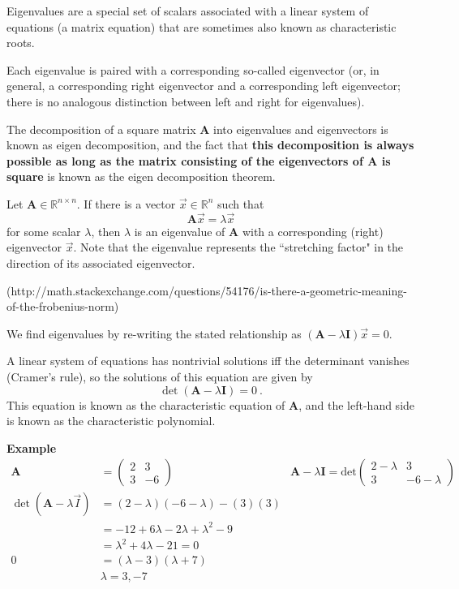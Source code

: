 \documentclass[12pt]{article}
\newcommand{\ve}[1]{\ensuremath{\mathbf{#1}}}
\begin{document}
Eigenvalues are a special set of scalars associated with a linear system of equations (a matrix equation) that are sometimes also known as characteristic roots. 

Each eigenvalue is paired with a corresponding so-called eigenvector (or, in general, a corresponding right eigenvector and a corresponding left eigenvector; there is no analogous distinction between left and right for eigenvalues).

The decomposition of a square matrix $\ve{A}$ into eigenvalues and eigenvectors is known as eigen decomposition, and the fact that \textbf{this decomposition is always possible as long as the matrix consisting of the eigenvectors of $\ve{A}$ is square} is known as the eigen decomposition theorem.

Let $\ve{A} \in \mathbb{R}^{n \times n}$. If there is a vector $\vec{x} \in \mathbb{R}^{n}$ such that
%
\[\ve{A} \vec{x} = \lambda \vec{x}\]
%
for some scalar $\lambda$, then $\lambda$ is an eigenvalue of $\ve{A}$ with a corresponding (right) eigenvector $\vec{x}$. Note that the eigenvalue represents the ``stretching factor" in the direction of its associated eigenvector. 

(http://math.stackexchange.com/questions/54176/is-there-a-geometric-meaning-of-the-frobenius-norm)
 
We find eigenvalues by re-writing the stated relationship as $(\ve{A} - \lambda \ve{I})\vec{x}=0$.

A linear system of equations has nontrivial solutions iff the determinant vanishes (Cramer's rule), so the solutions of this equation are given by
%
\[\det(\ve{A} - \lambda \ve{I})=0 \:.\] 	
%
This equation is known as the characteristic equation of $\ve{A}$, and the left-hand side is known as the characteristic polynomial.

\textbf{Example}
\begin{align}
    \ve{A} &= \begin{pmatrix}
        2 & 3 \\
        3 & -6
    \end{pmatrix} 
    &\ve{A} - \lambda \ve{I} = \text{det}\begin{pmatrix}
        2 - \lambda & 3 \\
        3 & -6 - \lambda
    \end{pmatrix} \nonumber \\
%  
\det(\ve{A} - \lambda \vec{I}) &= (2 - \lambda)(-6 - \lambda) - (3)(3) \nonumber \\
%
&= -12 + 6\lambda -2\lambda + \lambda^2 -9 \nonumber \\
&= \lambda^2 + 4\lambda -21 = 0 \nonumber \\
0 &= (\lambda - 3)(\lambda + 7) \nonumber \\
&\boxed{\lambda = 3, -7} \nonumber
\end{align} 
\end{document}
